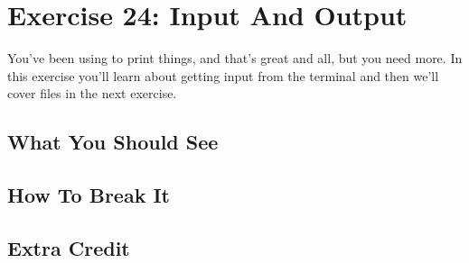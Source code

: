 \chapter{Exercise 24: Input And Output}

You've been using  to print things, and that's great
and all, but you need more.  In this exercise you'll learn about 
getting input from the terminal and then we'll cover files in the
next exercise.


\section{What You Should See}


\section{How To Break It}


\section{Extra Credit}




